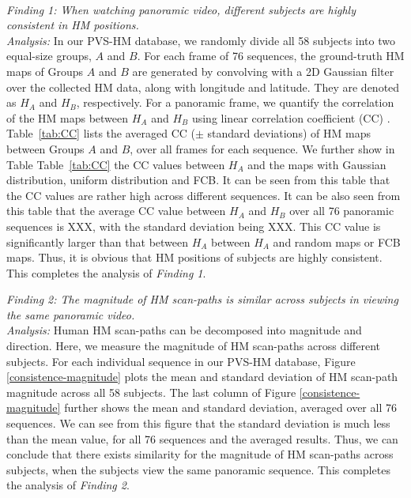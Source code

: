 \documentclass[10pt,journal,compsoc]{IEEEtran}
\begin{document}
\emph{\\Finding 1: When watching panoramic video, different subjects are highly consistent in HM positions.}
\\ \textit{Analysis:} In our PVS-HM database, we randomly divide all 58 subjects into two equal-size groups, $A$ and $B$.
For each frame of 76 sequences, the ground-truth HM maps of Groups $A$ and $B$ are generated by convolving with a 2D Gaussian filter over the collected HM data, along with longitude and latitude.
They are denoted as $H_A$ and $H_B$, respectively.
For a panoramic frame, we quantify the correlation of the HM maps between $H_A$ and $H_B$ using linear correlation coefficient (CC) \cite{li2015data}.
Table~\ref{tab:CC} lists the averaged CC ($\pm$ standard deviations) of HM maps between Groups $A$ and $B$, over all frames for each sequence.
We further show in Table Table~\ref{tab:CC} the CC values between $H_A$ and the maps with Gaussian distribution, uniform distribution and FCB.
It can be seen from this table that the CC values are rather high across different sequences.
It can be also seen from this table that the average CC value between $H_A$ and $H_B$ over all 76 panoramic sequences is XXX, with the standard deviation being XXX.
This CC value is significantly larger than that between $H_A$  between $H_A$ and random maps or FCB maps.
Thus, it is obvious that HM positions of subjects are highly consistent.
This completes the analysis of \textit{Finding 1}.

\emph{Finding 2: The magnitude of HM scan-paths is similar across subjects in viewing the same panoramic video.}
\\ \textit{Analysis:} Human HM scan-paths can be decomposed into magnitude and direction.
 Here, we measure the magnitude of HM scan-paths across different subjects.
For each individual sequence in our PVS-HM database, Figure \ref{consistence-magnitude} plots the mean and standard deviation of HM scan-path magnitude across all 58 subjects.
The last column of Figure \ref{consistence-magnitude} further shows the mean and standard deviation, averaged over all 76 sequences.
We can see from this figure that the standard deviation is much less than the mean value, for all 76 sequences and the averaged results.
Thus, we can conclude that there exists similarity for the magnitude of HM scan-paths across subjects, when the subjects view the same panoramic sequence.
This completes the analysis of \textit{Finding 2}.

\end{document}
